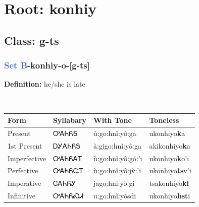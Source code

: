 \needspace{4in}
\section*{Root: konhiy}
\nopagebreak
{}
\needspace{3in}
\subsection*{Class: g-ts}
\nopagebreak
\needspace{2in}
\subsubsection*{\textcolor{RoyalBlue}{Set B}{-}\textbf{konhiy}{-}o{-}[g-ts]}
\nopagebreak
\textbf{Definition: } he/she is late
\\[0.5em]
\begin{tabularx}{\textwidth}{l X X X}%
\toprule%
\textbf{Form}&\textbf{Syllabary}&\textbf{With Tone}&\textbf{Toneless}\\%
\midrule%
Present&ᎤᎪᏂᏲᎦ&ù:go:hnǐ:yô:ga&ukonhiyo\textbf{k}a\\%
1st Present&ᎠᎩᎪᏂᏲᎦ&à:gigo:hnǐ:yô:ga&akikonhiyo\textbf{k}a\\%
Imperfective&ᎤᎪᏂᏲᎪᎢ&ù:go:hnǐ:yô:gó:’i&ukonhiyo\textbf{k}o'i\\%
Perfective&ᎤᎪᏂᏲᏨᎢ&ù:go:hnǐ:yô:jv̌:’i&ukonhiyo\textbf{ts}v'i\\%
Imperative&ᏣᎪᏂᏲᎩ&jago:hni:yò:gi&tsakonhiyo\textbf{ki}\\%
Infinitive&ᎤᎪᏂᏲᏍᏗ&u:go:hnǐ:yósdi&ukonhiyo\textbf{hst}i\\%
\bottomrule%
\end{tabularx}
\\[1em]